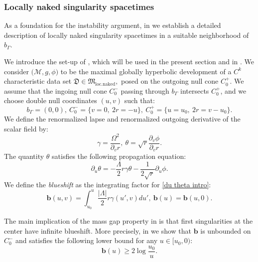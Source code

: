 \documentclass[11pt]{article}
\numberwithin{equation}{section}
\begin{document}
\subsubsection{Locally naked singularity spacetimes}\label{locally naked section intro}

As a foundation for the instability argument, in  we establish a detailed description of locally naked singularity spacetimes in a suitable neighborhood of $b_{\Gamma}.$ 

We introduce the set-up of , which will be used in the present section and in . We consider $\big(\mathcal{M},g,\phi\big)$ to be the maximal globally hyperbolic development of a $C^k$ characteristic data set $\mathfrak{D}\in\mathfrak{M}_{\mathrm{loc.naked}},$ posed on the outgoing null cone $C_0^+.$ We assume that the ingoing null cone $C_0^-$ passing through $b_{\Gamma}$ intersects $C_0^+$, and we choose double null coordinates $(u,v)$ such that: \[b_{\Gamma}=(0,0),\ C_0^-=\big\{v=0,\ 2r=-u\big\},\ C_0^+=\big\{u=u_0,\ 2r=v-u_0\big\}.\]
We define the renormalized lapse and renormalized outgoing derivative of the scalar field by:
\[\gamma=\frac{\Omega^2}{\partial_vr},\ \theta=\sqrt{r}\frac{\partial_v\phi}{\partial_vr}.\]
The quantity $\theta$ satisfies the following propagation equation:
\begin{equation}\label{du theta intro}
    \partial_u\theta=-\frac{\Lambda}{2}r\gamma\theta-\frac{1}{2\sqrt{r}}\partial_u\phi.
\end{equation}
We define the \textit{blueshift} as the integrating factor for \eqref{du theta intro}:
    \begin{equation}\label{blueshift definition eq intro}
        \mathbf{b}(u,v)=\int_{u_0}^u\frac{|\Lambda|}{2}r\gamma(u',v)du',\ \mathbf{b}(u)=\mathbf{b}(u,0).
    \end{equation}

The main implication of the mass gap property in  is that first singularities at the center have infinite blueshift. More precisely, in  we show that $\mathbf{b}$ is unbounded on $C_0^-$ and satisfies the following lower bound for any $u\in[u_0,0):$
\begin{equation}\label{lower bound blueshift intro}
    \mathbf{b}(u)\geq2\log\frac{u_0}{u}.
\end{equation}
\end{document}
